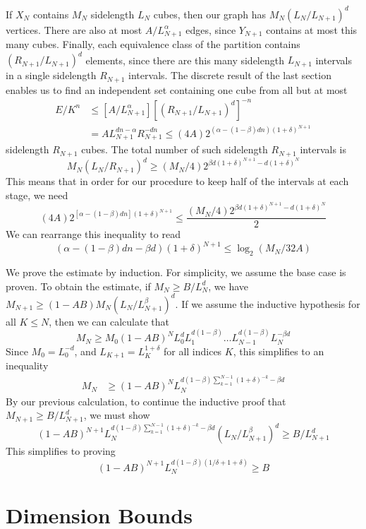 \documentclass{article}
\theoremstyle{plain}
\theoremstyle{plain}
\begin{document}
If $X_N$ contains $M_N$ sidelength $L_N$ cubes, then our graph has $M_N (L_N/L_{N+1})^d$ vertices. There are also at most $A/L_{N+1}^\alpha$ edges, since $Y_{N+1}$ contains at most this many cubes. Finally, each equivalence class of the partition contains $(R_{N+1} / L_{N+1})^d$ elements, since there are this many sidelength $L_{N+1}$ intervals in a single sidelength $R_{N+1}$ intervals. The discrete result of the last section enables us to find an independent set containing one cube from all but at most
%
\begin{align*}
	E/K^n &\leq [A/L_{N+1}^\alpha] [(R_{N+1} / L_{N+1})^d]^{-n}\\
		&= A L_{N+1}^{dn-\alpha} R_{N+1}^{-dn} \leq (4 A) 2^{(\alpha - (1 - \beta) d n) (1 + \delta)^{N+1}}
\end{align*}
%
sidelength $R_{N+1}$ cubes. The total number of such sidelength $R_{N+1}$ intervals is
%
\[ M_N (L_N/R_{N+1})^d \geq (M_N/4) 2^{\beta d(1 + \delta)^{N+1} - d (1 + \delta)^N} \]
%
This means that in order for our procedure to keep half of the intervals at each stage, we need
%
\[ (4A) 2^{[\alpha - (1 - \beta) dn] (1 + \delta)^{N+1}} \leq \frac{(M_N/4) 2^{\beta d(1 + \delta)^{N+1} - d (1 + \delta)^N}}{2} \]
%
We can rearrange this inequality to read
%
\[ (\alpha - (1 - \beta) dn - \beta d) (1 + \delta)^{N+1} \leq \log_2 (M_N/32A) \]

\newpage

We prove the estimate by induction. For simplicity, we assume the base case is proven. To obtain the estimate, if $M_N \geq B/L_N^d$, we have $M_{N+1} \geq (1 - AB) M_N (L_N/L_{N+1}^\beta)^d$. If we assume the inductive hypothesis for all $K \leq N$, then we can calculate that
%
\[ M_N \geq M_0 (1 - AB)^N L_0^d L_1^{d(1 - \beta)} \dots L_{N-1}^{d(1 - \beta)} L_N^{-\beta d} \]
%
Since $M_0 = L_0^{-d}$, and $L_{K+1} = L_K^{1 + \delta}$ for all indices $K$, this simplifies to an inequality
%
\begin{align*}
	M_N &\geq (1 - AB)^N L_N^{d(1 - \beta) \sum_{k = 1}^{N-1} (1 + \delta)^{-k} -\beta d}
\end{align*}
%
By our previous calculation, to continue the inductive proof that $M_{N+1} \geq B/L_{N+1}^d$, we must show
%
\[ (1 - AB)^{N+1} L_N^{d(1 - \beta) \sum_{k = 1}^{N-1} (1 + \delta)^{-k} - \beta d} (L_N/L_{N+1}^\beta)^d \geq B/L_{N+1}^d \]
%
This simplifies to proving
%
\[ (1 - AB)^{N+1} L_N^{d(1 - \beta)(1/\delta + 1 + \delta)} \geq B \]
%


\section{Dimension Bounds}
\end{document}
